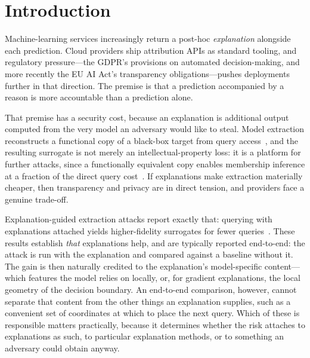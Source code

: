 \documentclass[sigconf,anonymous,review]{acmart}
\begin{document}

\maketitle

\section{Introduction}
Machine-learning services increasingly return a post-hoc \emph{explanation} alongside each
prediction. Cloud providers ship attribution APIs as standard tooling, and regulatory pressure---the
GDPR's provisions on automated decision-making, and more recently the EU AI Act's transparency
obligations---pushes deployments further in that direction. The premise is that a prediction
accompanied by a reason is more accountable than a prediction alone.

That premise has a security cost, because an explanation is additional output computed from the very
model an adversary would like to steal. Model extraction reconstructs a functional copy of a
black-box target from query access~\cite{tramer2016stealing,jagielski2020high}, and the resulting
surrogate is not merely an intellectual-property loss: it is a platform for further attacks, since a
functionally equivalent copy enables membership inference at a fraction of the direct query
cost~\cite{oksuz2026lomime,ezzeddine2026membership}. If explanations make extraction materially
cheaper, then transparency and privacy are in direct tension, and providers face a genuine trade-off.

Explanation-guided extraction attacks report exactly that: querying with explanations attached yields
higher-fidelity surrogates for fewer queries~\cite{oksuz2024autolycus,milli2019model,aivodji2020model}.
These results establish \emph{that} explanations help, and are typically reported end-to-end: the
attack is run with the explanation and compared against a baseline without it. The gain is then
naturally credited to the explanation's model-specific content---which features the model relies on
locally, or, for gradient explanations, the local geometry of the decision boundary. An end-to-end
comparison, however, cannot separate that content from the other things an explanation supplies, such
as a convenient set of coordinates at which to place the next query. Which of these is responsible
matters practically, because it determines whether the risk attaches to explanations as such, to
particular explanation methods, or to something an adversary could obtain anyway.
\end{document}
